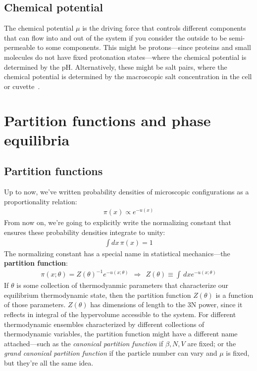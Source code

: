 \documentclass[english,course]{lecture}
\begin{document}
\subsection{Chemical potential}

The chemical potential $\mu$ is the driving force that controls different components that can flow into and out of the system if you consider the outside to be semi-permeable to some components.
This might be protons---since proteins and small molecules do not have fixed protonation states---where the chemical potential is determined by the pH.
Alternatively, these might be salt pairs, where the chemical potential is determined by the macroscopic salt concentration in the cell or cuvette~\cite{ross2018biomolecular}.

\section{Partition functions and phase equilibria}

\subsection{Partition functions}

Up to now, we've written probability densities of microscopic configurations as a proportionality relation:
\begin{eqnarray}
\pi(x) \propto e^{-u(x)}
\end{eqnarray}
From now on, we're going to explicitly write the normalizing constant that ensures these probability densities integrate to unity:
\begin{eqnarray}
\int dx \, \pi(x) = 1
\end{eqnarray}
The normalizing constant has a special name in statistical mechanics---the {\bf partition function}:
\begin{eqnarray}
\pi(x; \theta) = Z(\theta)^{-1} e^{-u(x; \theta)} \:\: \Rightarrow \:\: Z(\theta) \equiv \int \, dx e^{-u(x; \theta)}
\end{eqnarray}
If $\theta$ is some collection of thermodyanmic parameters that characterize our equilibrium thermodynamic state, then the partition function $Z(\theta)$ is a function of those parameters.
$Z(\theta)$ has dimensions of length to the 3N power, since it reflects in integral of the hypervolume accessible to the system.
For different thermodynamic ensembles characterized by different collections of thermodynamic variables, the partition function might have a different name attached---such as the \emph{canonical partition function} if $\beta, N, V$ are fixed; or the \emph{grand canonical partition function} if the particle number can vary and $\mu$ is fixed, but they're all the same idea.
\end{document}
